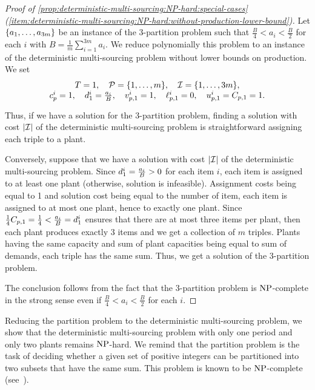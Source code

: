\begin{proof}[Proof of \cref{prop:deterministic-multi-sourcing:NP-hard:special-cases} (\cref{item:deterministic-multi-sourcing:NP-hard:without-production-lower-bound})]
Let $\crbracket{a_1,\ldots,a_{3m}}$ be an instance of the 3-partition problem such that $\frac{B}{4} < a_i < \frac{B}{2}$ for each $i$ with $B=\frac{1}{m}\sum_{i=1}^{3m}a_i$.
We reduce polynomially this problem to an instance of the deterministic multi-sourcing problem without lower bounds on production.
We set
\begin{equation}
\begin{array}{c}
  \horizon=1
  ,\quad
  \plants=\range[1]{m}
  ,\quad
  \REF=\range[1]{3m},
\\ \smallskip
  \affect_p^i=1
  ,\quad
  \demand_1^i=\frac{a_i}{B}
  ,\quad
  \rate_{p,1}^i=1
  ,\quad
  \lb_{p,1}^i=0
  ,\quad
  \ub_{p,1}^i=\capacity_{p,1}=1.
\end{array}
\end{equation}
Thus, if we have a solution for the 3-partition problem, finding a solution with cost $\card{\REF}$ of the deterministic multi-sourcing problem is straightforward assigning each triple to a plant.


Conversely, suppose that we have a solution with cost $\card{\REF}$ of the deterministic multi-sourcing problem.
Since $d_1^i=\frac{a_i}{B}>0$ for each item $i$, each item is assigned to at least one plant (otherwise, solution is infeasible).
Assignment costs being equal to 1 and solution cost being equal to the number of item, each item is assigned to at most one plant, hence to exactly one plant.
Since $\frac{1}{4}C_{p,1}=\frac{1}{4} < \frac{a_i}{B} = d_1^i$ ensures that there are at most three items per plant, then each plant produces exactly 3 items and we get a collection of $m$ triples.
Plants having the same capacity and sum of plant capacities being equal to sum of demands, each triple has the same sum.
Thus, we get a solution of the 3-partition problem.


The conclusion follows from the fact that the 3-partition problem is $\operatorname{NP}$-complete in the strong sense even if $\frac{B}{4} < a_i < \frac{B}{2}$ for each $i$.
\end{proof}


Reducing the partition problem to the deterministic multi-sourcing problem, we show that the deterministic multi-sourcing problem with only one period and only two plants remains $\operatorname{NP}$-hard.
We remind that the partition problem is the task of deciding whether a given set of positive integers can be partitioned into two subsets that have the same sum.
This problem is known to be $\operatorname{NP}$-complete (see~\citet{Garey1979}).



